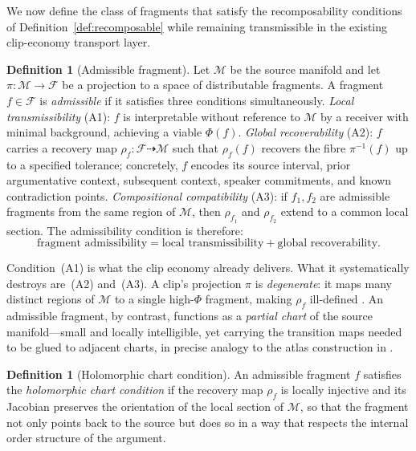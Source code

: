 \documentclass{amsart}
\theoremstyle{plain}
\theoremstyle{definition}
\newtheorem{definition}[theorem]{Definition}
\theoremstyle{remark}
\newcommand{\scalar}{\Phi}
\newcommand{\Man}{\mathcal{M}}
\newcommand{\Frag}{\mathcal{F}}
\begin{document}
We now define the class of fragments that satisfy the recomposability conditions of
Definition~\ref{def:recomposable} while remaining transmissible in the existing
clip-economy transport layer.

\begin{definition}[Admissible fragment]
  \label{def:admissible}
  Let $\Man$ be the source manifold and let $\pi\colon \Man \to \Frag$ be a
  projection to a space of distributable fragments.  A fragment $f \in \Frag$ is
  \emph{admissible} if it satisfies three conditions simultaneously.
  \emph{Local transmissibility} (A1): $f$ is interpretable without reference to
  $\Man$ by a receiver with minimal background, achieving a viable $\scalar(f)$.
  \emph{Global recoverability} (A2): $f$ carries a recovery map
  $\rho_f\colon \Frag \dashrightarrow \Man$ such that $\rho_f(f)$ recovers the
  fibre $\pi^{-1}(f)$ up to a specified tolerance; concretely, $f$ encodes its
  source interval, prior argumentative context, subsequent context, speaker
  commitments, and known contradiction points.  \emph{Compositional compatibility}
  (A3): if $f_1, f_2$ are admissible fragments from the same region of $\Man$,
  then $\rho_{f_1}$ and $\rho_{f_2}$ extend to a common local section.  The
  admissibility condition is therefore:
  \[
    \text{fragment admissibility} =
    \text{local transmissibility} + \text{global recoverability}.
  \]
\end{definition}

Condition~(A1) is what the clip economy already delivers.  What it systematically
destroys are~(A2) and~(A3).  A clip's projection $\pi$ is \emph{degenerate}: it
maps many distinct regions of $\Man$ to a single high-$\scalar$ fragment, making
$\rho_f$ ill-defined \cite{spivak2014}.  An admissible fragment, by contrast,
functions as a \emph{partial chart} of the source manifold---small and locally
intelligible, yet carrying the transition maps needed to be glued to adjacent
charts, in precise analogy to the atlas construction in \cite{munkres2000}.

\begin{definition}[Holomorphic chart condition]
  \label{def:chart}
  An admissible fragment $f$ satisfies the \emph{holomorphic chart condition} if
  the recovery map $\rho_f$ is locally injective and its Jacobian preserves the
  orientation of the local section of $\Man$, so that the fragment not only points
  back to the source but does so in a way that respects the internal order structure
  of the argument.
\end{definition}
\end{document}
